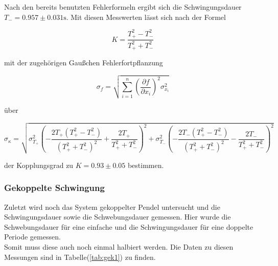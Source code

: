             \noindent Nach den bereits benutzten Fehlerformeln ergibt sich die Schwingungsdauer $T_- = 0.957 \pm 0.031 \si{\second}$.
            Mit diesen Messwerten lässt sich nach der Formel 

            \begin{equation*}
            K = \frac{T_{+}^2 - T_{-}^2}{T_{+}^2 + T_{-}^2} 
            \end{equation*}

            \noindent mit der zugehörigen Gaußchen Fehlerfortpflanzung
            
            \begin{equation}
            \sigma_f = \sqrt{\sum_{i=1}^{n} \left( \frac{\partial f}{\partial x_i} \right)^2 \sigma_{x_i}^2}
            \label{eqn:gauss}
            \end{equation}
            
            \noindent über

            \begin{equation*}
                \sigma_{\kappa} = \sqrt{\sigma_{T_{+}}^{2} \left(- \frac{2 T_{+} \left(T_{+}^{2} - T_{-}^{2}\right)}{\left(T_{+}^{2}
                 + T_{-}^{2}\right)^{2}} + \frac{2 T_{+}}{T_{+}^{2} + T_{-}^{2}}\right)^{2} + \sigma_{T_{-}}^{2} \left(- \frac{2 T_{-}
                  \left(T_{+}^{2} - T_{-}^{2}\right)}{\left(T_{+}^{2} + T_{-}^{2}\right)^{2}} - \frac{2 T_{-}}{T_{+}^{2} + T_{-}^{2}}\right)^{2}}
            \end{equation*}

            \noindent der Kopplungsgrad zu $K = 0.93 \pm 0.05$ bestimmen.

        \subsubsection{Gekoppelte Schwingung}

            \noindent Zuletzt wird noch das System gekoppelter Pendel untersucht und die Schwingungsdauer sowie die Schwebungsdauer gemessen. 
            Hier wurde die Schwebungsdauer für eine einfache und die Schwingungsdauer für eine doppelte Periode gemessen.\\
            Somit muss diese auch noch einmal halbiert werden. 
            Die Daten zu diesen Messungen sind in Tabelle(\ref{tab:gek1}) zu finden.

